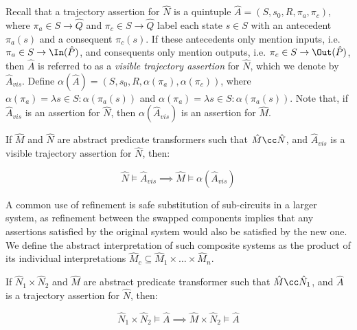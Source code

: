 Recall that a trajectory assertion for $\hat N$ is a quintuple $\hat A = (S, s_{0}, R, \pi_{a}, \pi_{c})$, where $\pi_{a} \in S \rightarrow \hat Q$ and $\pi_{c} \in S \rightarrow \hat Q$ label each state $s \in S$ with an antecedent $\pi_{a}(s)$ and a consequent $\pi_{c}(s)$. If these antecedents only mention inputs, i.e. $\pi_{a} \in S \rightarrow \In(\hat P)$, and consequents only mention outputs, i.e. $\pi_{c} \in S \rightarrow \Out(\hat P)$, then $\hat A$ is referred to as a \textit{visible trajectory assertion} for $\hat N$, which we denote by $\hat A_{vis}$. Define $\alpha(\hat A) = (S, s_{0}, R, \alpha(\pi_{a}), \alpha(\pi_{c}))$, where $\alpha(\pi_{a}) = \lambda s \in S : \alpha(\pi_{a}(s))$ and $\alpha(\pi_{a}) = \lambda s \in S : \alpha(\pi_{a}(s))$. Note that, if $\hat A_{vis}$ is an assertion for $\hat N$, then $\alpha(\hat A_{vis})$ is an assertion for $\hat M$.



\begin{theorem}
\label{thm:refinement}
If $\hat M$ and $\hat N$ are abstract predicate transformers such that $\hat M \cc \hat N$, and $\hat A_{vis}$ is a visible trajectory assertion for $\hat N$, then:

\begin{equation*}
\hat N \models \hat A_{vis} \implies \hat M \models \alpha(\hat A_{vis})
\end{equation*}
\end{theorem}

A common use of refinement is safe substitution of sub-circuits in a larger system, as refinement between the swapped components implies that any assertions satisfied by the original system would also be satisfied by the new one. We define the abstract interpretation of such composite systems as the product of its individual interpretations $\hat M_{c} \subseteq \hat M_{1} \times \ldots \times \hat M_{n}$.

\begin{theorem}
\label{thm:refinement-product}
If $\hat N_{1} \times \hat N_{2}$ and $\hat M$ are abstract predicate transformer such that $\hat M \cc \hat N_{1}$, and $\hat A$ is a trajectory assertion for $\hat N$, then:

\begin{equation*}
\hat N_{1} \times \hat N_{2} \models \hat A \implies \hat M \times \hat N_{2} \models \hat A
\end{equation*}
\end{theorem}

